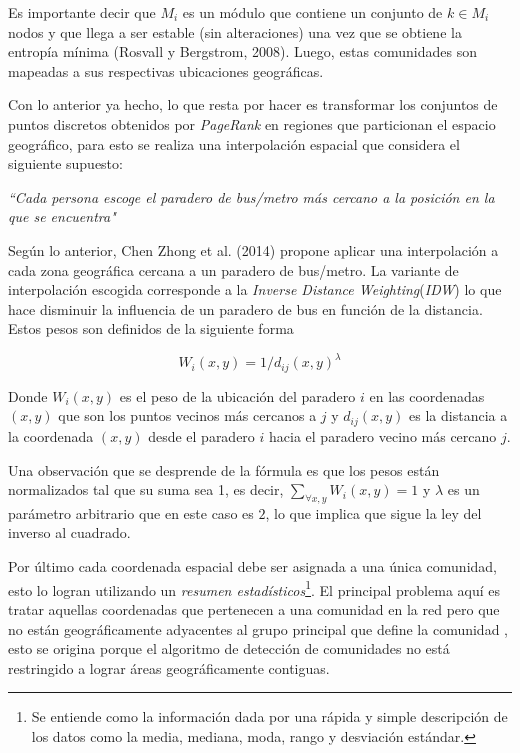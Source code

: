 \documentclass[12pt]{article}
\begin{document}
Es importante decir que $M_i$ es un módulo que contiene un conjunto de $k \in M_i$ nodos y que llega a ser estable (sin alteraciones) una vez que se obtiene la entropía mínima (Rosvall y Bergstrom, 2008). Luego, estas comunidades son mapeadas a sus respectivas ubicaciones geográficas.

Con lo anterior ya hecho, lo que resta por hacer es transformar los conjuntos de puntos discretos obtenidos por \textit{PageRank} en regiones que particionan el espacio geográfico, para esto se realiza una interpolación espacial que considera el siguiente supuesto:

\begin{center}
	\textit{``Cada persona escoge el paradero de bus/metro más cercano a la posición en la que se encuentra"}
\end{center} 

Según lo anterior, Chen Zhong et al. (2014) propone aplicar una interpolación a cada zona geográfica cercana a un paradero de bus/metro. La variante de interpolación escogida corresponde a la \textit{Inverse Distance Weighting}(\textit{IDW}) lo que hace disminuir la influencia de un paradero de bus en función de la distancia. Estos pesos son definidos de la siguiente forma 

$$
	W_i(x,y) = 1/d_{ij} (x,y)^\lambda
$$

Donde $W_i(x,y)$ es el peso de la ubicación del paradero $i$ en las coordenadas $(x,y)$ que son los puntos vecinos más cercanos a $j$ y $d_{ij} (x,y)$ es la distancia a la coordenada $(x,y)$ desde el paradero $i$ hacia el paradero vecino más cercano $j$.

Una observación que se desprende de la fórmula es que los pesos están normalizados tal que su suma sea 1, es decir, $\sum_{\forall x,y} W_i (x,y)=1$ y $\lambda$ es un parámetro arbitrario que en este caso es $2$, lo que implica que sigue la ley del inverso al cuadrado.

Por último cada coordenada espacial debe ser asignada a una única comunidad, esto lo logran utilizando un  \textit{resumen estadísticos}\footnote{Se entiende como la información dada por una rápida y simple descripción de los datos como la media, mediana, moda, rango y desviación estándar.}. El principal problema aquí es tratar aquellas coordenadas que pertenecen a una comunidad en la red pero que no están geográficamente adyacentes al grupo principal que define la comunidad	, esto se origina porque el algoritmo de detección de comunidades no está restringido a lograr áreas geográficamente contiguas.
\end{document}
